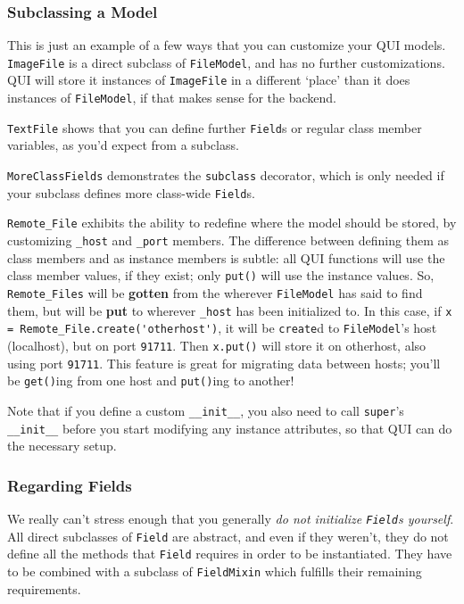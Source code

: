 \documentclass{article} %
\newcommand{\il}[1]{\mbox{\lstinline{#1}}}
\begin{document}
\subsubsection{Subclassing a Model}
This is just an example of a few ways that you can customize your QUI models. \il{ImageFile} is a direct subclass of \il{FileModel}, and has no further customizations.
QUI will store it instances of \il{ImageFile} in a different `place' than it does instances of \il{FileModel}, if that makes sense for the backend.

\il{TextFile} shows that you can define further \il{Field}s or regular class member variables, as you'd expect from a subclass.

\il{MoreClassFields} demonstrates the \il{subclass} decorator, which is only needed if your subclass defines more class-wide \il{Field}s. 

\il{Remote_File} exhibits the ability to redefine where the model should be stored, by customizing \il{_host} and \il{_port} members. The difference between defining them as class members and as instance members is subtle: all QUI functions will use the class member values, if they exist; only \il{put()} will use the instance values. So, \il{Remote_Files} will be \textbf{gotten} from the wherever \il{FileModel} has said to find them, but will be \textbf{put} to wherever \il{_host} has been initialized to. In this case, if \il{x = Remote_File.create('otherhost')}, it will be \il{create}d to \il{FileModel}'s host (localhost), but on port \il{91711}. Then \il{x.put()} will store it on otherhost, also using port \il{91711}. This feature is great for migrating data between hosts; you'll be \il{get()}ing from one host and \il{put()}ing to another!

Note that if you define a custom \il{__init__}, you also need to call \il{super}'s \il{__init__}  before you start modifying any instance attributes, so that QUI can do the necessary setup.

\subsubsection{Regarding Fields}
We really can't stress enough that you generally \emph{do not initialize \il{Field}s yourself}. All direct subclasses of \il{Field} are abstract, and even if they weren't, they do not define all the methods that \il{Field} requires in order to be instantiated. They have to be combined with a subclass of \il{FieldMixin} which fulfills their remaining requirements.
\end{document}
